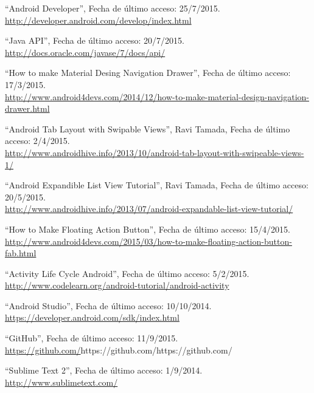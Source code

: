 ``Android Developer'', Fecha de último acceso: 25/7/2015.\\ \href{http://developer.android.com/develop/index.html}{http://developer.android.com/develop/index.html}

 ``Java API'', Fecha de último acceso: 20/7/2015.\\ \href{http://docs.oracle.com/javase/7/docs/api/}{http://docs.oracle.com/javase/7/docs/api/}

 ``How to make Material Desing Navigation Drawer'', Fecha de último acceso: 17/3/2015.\\ \href{http://www.android4devs.com/2014/12/how-to-make-material-design-navigation-drawer.html}{http://www.android4devs.com/2014/12/how-to-make-material-design-navigation-drawer.html}

 ``Android Tab Layout with Swipable Views'', Ravi Tamada, Fecha de último acceso: 2/4/2015.\\ \href{http://www.androidhive.info/2013/10/android-tab-layout-with-swipeable-views-1/}{http://www.androidhive.info/2013/10/android-tab-layout-with-swipeable-views-1/}

 ``Android Expandible List View Tutorial'', Ravi Tamada, Fecha de último acceso: 20/5/2015.\\ \href{http://www.androidhive.info/2013/07/android-expandable-list-view-tutorial/}{http://www.androidhive.info/2013/07/android-expandable-list-view-tutorial/}

 ``How to Make Floating Action Button'', Fecha de último acceso: 15/4/2015.\\ \href{http://www.android4devs.com/2015/03/how-to-make-floating-action-button-fab.html}{http://www.android4devs.com/2015/03/how-to-make-floating-action-button-fab.html}

 ``Activity Life Cycle Android'', Fecha de último acceso: 5/2/2015.\\ \href{http://www.codelearn.org/android-tutorial/android-activity}{http://www.codelearn.org/android-tutorial/android-activity}

 ``Android Studio'', Fecha de último acceso: 10/10/2014.\\ \href{https://developer.android.com/sdk/index.html}{https://developer.android.com/sdk/index.html}

 ``GitHub'', Fecha de último acceso: 11/9/2015.\\ \href{https://github.com/}{https://github.com/}{https://github.com/}{https://github.com/}

 ``Sublime Text 2'', Fecha de último acceso: 1/9/2014.\\ \href{http://www.sublimetext.com/}{http://www.sublimetext.com/}
